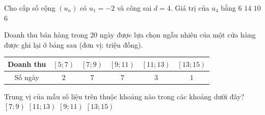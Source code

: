 \begin{ex} %
	Cho cấp số cộng $\left(u_n\right)$ có $u_1 = -2$ và công sai $d = 4$. Giá trị của $u_4$ bằng
	\choice
	{$6$}
	{$14$}
	{\True $10$}
	{$6$}
\end{ex}

\begin{ex} %
	Doanh thu bán hàng trong $20$ ngày được lựa chọn ngẫu nhiên của một cửa hàng được ghi lại ở bảng sau (đơn vị: triệu đồng).
	\begin{center}
		\begin{tabular}{|c|c|c|c|c|c|}
			\hline
			Doanh thu & $\left[5; 7\right)$ & $\left[7; 9\right)$ & $\left[9; 11\right)$ & $\left[11; 13\right)$ & $\left[13; 15\right)$ \\
			\hline
			Số ngày & $2$ & $7$ & $7$ & $3$ & $1$ \\
			\hline
		\end{tabular}
	\end{center}
	Trung vị của mẫu số liệu trên thuộc khoảng nào trong các khoảng dưới đây?
	\choice
	{$\left[7; 9\right)$}
	{$\left[11; 13\right)$}
	{\True $\left[9; 11\right)$}
	{$\left[13; 15\right)$}
	\loigiai{
		Cỡ mẫu là $n = 20 \Rightarrow \dfrac{n}{2} = 10$ nên nhóm chứa trung vị là $\left[9; 11\right)$.
	}
\end{ex}


